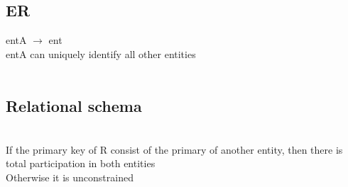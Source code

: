 \documentclass[11pt]{article}
\begin{document}
\begin{multicols*}{3}
\subsection*{ER}
entA $\rightarrow$ ent\\
entA can uniquely identify all other entities\\
\\
\subsection*{Relational schema}\\
If the primary key of R consist of the primary of another entity, then there is total participation in both entities\\
Otherwise it is unconstrained
\end{multicols*}
\end{document}
